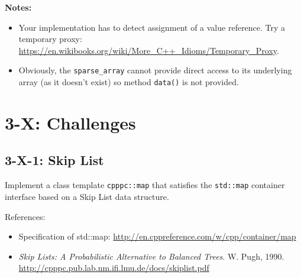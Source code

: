 \documentclass[]{article}
\providecommand{\tightlist}{%
  \setlength{\itemsep}{0pt}\setlength{\parskip}{0pt}}
\begin{document}
\textbf{Notes:}

\begin{itemize}
\tightlist
\item
  Your implementation has to detect assignment of a value reference. Try
  a temporary proxy:
  \url{https://en.wikibooks.org/wiki/More_C++_Idioms/Temporary_Proxy}.
\item
  Obviously, the \texttt{sparse\_array} cannot provide direct access to
  its underlying array (as it doesn't exist) so method \texttt{data()}
  is not provided.
\end{itemize}

\section{3-X: Challenges}\label{x-challenges}

\subsection{3-X-1: Skip List}\label{x-1-skip-list}

Implement a class template \texttt{cpppc::map} that satisfies the
\texttt{std::map} container interface based on a Skip List data
structure.

References:

\begin{itemize}
\tightlist
\item
  Specification of std::map:
  \url{http://en.cppreference.com/w/cpp/container/map}
\item
  \emph{Skip Lists: A Probabilistic Alternative to Balanced Trees}. W.
  Pugh, 1990. \url{http://cpppc.pub.lab.nm.ifi.lmu.de/docs/skiplist.pdf}
\end{itemize}
\end{document}

